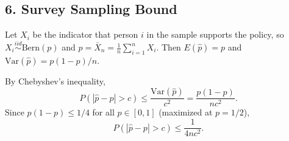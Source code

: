 \documentclass{article}
\begin{document}
\subsection*{6. Survey Sampling Bound}

Let $X_i$ be the indicator that person $i$ in the sample supports the policy, so $X_i\overset{iid}{\sim}\text{Bern}(p)$ and $\hat p=\bar X_n=\frac{1}{n}\sum_{i=1}^n X_i$. Then $E(\hat p)=p$ and $\text{Var}(\hat p)=p(1-p)/n$.

By Chebyshev's inequality,
$$
P(|\hat p-p|>c)\le\frac{\text{Var}(\hat p)}{c^2}=\frac{p(1-p)}{nc^2}.
$$
Since $p(1-p)\le1/4$ for all $p\in[0,1]$ (maximized at $p=1/2$),
$$
P(|\hat p-p|>c)\le\frac{1}{4nc^2}.
$$
\end{document}
